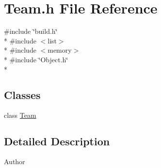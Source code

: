 \section{Team.\-h File Reference}
\label{_team_8h}
{\ttfamily \#include \char`\"{}build.\-h\char`\"{}}\\*
{\ttfamily \#include $<$list$>$}\\*
{\ttfamily \#include $<$memory$>$}\\*
{\ttfamily \#include \char`\"{}Object.\-h\char`\"{}}\\*
\subsection*{Classes}
\begin{DoxyCompactItemize}
\item 
class \hyperlink{class_team}{Team}
\end{DoxyCompactItemize}


\subsection{Detailed Description}
\begin{DoxyAuthor}{Author}

\end{DoxyAuthor}
